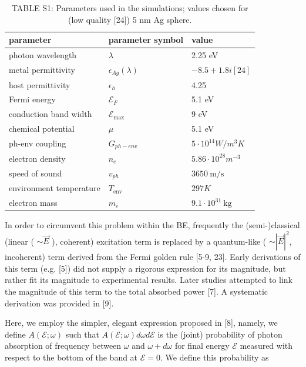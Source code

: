 \documentclass[10pt]{article}
\begin{document}
\begin{table}[h]
\begin{center}
\captionsetup{labelformat=empty}
\caption{TABLE S1: Parameters used in the simulations; values chosen for (low quality [24]) 5 nm Ag sphere.}
\begin{tabular}{|l|l|l|}
\hline
parameter & parameter symbol & value \\
\hline
photon wavelength & $\lambda$ & 2.25 eV \\
\hline
metal permittivity & $\epsilon_{A g}(\lambda)$ & $-8.5+1.8 i[24]$ \\
\hline
host permittivity & $\epsilon_{h}$ & 4.25 \\
\hline
Fermi energy & $\mathcal{E}_{F}$ & 5.1 eV \\
\hline
conduction band width & $\mathcal{E}_{\text {max }}$ & 9 eV \\
\hline
chemical potential & $\mu$ & 5.1 eV \\
\hline
ph-env coupling & $G_{p h-e n v}$ & $5 \cdot 10^{14} W / m^{3} K$ \\
\hline
electron density & $n_{e}$ & $5.86 \cdot 10^{28} m^{-3}$ \\
\hline
speed of sound & $v_{p h}$ & $3650 \mathrm{~m} / \mathrm{s}$ \\
\hline
environment temperature & $T_{\text {env }}$ & $297 K$ \\
\hline
electron mass & $m_{e}$ & $9.1 \cdot 10^{31} \mathrm{~kg}$ \\
\hline
\end{tabular}
\end{center}
\end{table}

In order to circumvent this problem within the BE, frequently the (semi-)classical (linear ( $\sim \vec{E}$ ), coherent) excitation term is replaced by a quantum-like ( $\sim|\vec{E}|^{2}$, incoherent) term derived from the Fermi golden rule [5-9, 23]. Early derivations of this term (e.g. [5]) did not supply a rigorous expression for its magnitude, but rather fit its magnitude to experimental results. Later studies attempted to link the magnitude of this term to the total absorbed power [7]. A systematic derivation was provided in [9].

Here, we employ the simpler, elegant expression proposed in [8], namely, we define $A(\mathcal{E} ; \omega)$ such that $A(\mathcal{E} ; \omega) d \omega d \mathcal{E}$ is the (joint) probability of photon absorption of frequency between $\omega$ and $\omega+d \omega$ for final energy $\mathcal{E}$ measured with respect to the bottom of the band at $\mathcal{E}=0$. We define this probability as
\end{document}

